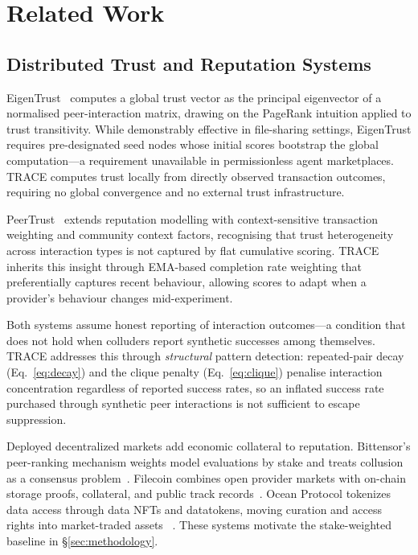 \documentclass[sigconf,nonacm,10pt]{acmart}
\begin{document}
\section{Related Work}
\label{sec:related}

\subsection{Distributed Trust and Reputation Systems}

EigenTrust~\cite{kamvar2003eigentrust} computes a global trust
vector as the principal eigenvector of a normalised
peer-interaction matrix, drawing on the PageRank intuition applied
to trust transitivity. While demonstrably effective in file-sharing
settings, EigenTrust requires pre-designated seed nodes whose
initial scores bootstrap the global computation---a requirement
unavailable in permissionless agent marketplaces. TRACE computes
trust locally from directly observed transaction outcomes,
requiring no global convergence and no external trust
infrastructure.

PeerTrust~\cite{xiong2004peertrust} extends reputation modelling
with context-sensitive transaction weighting and community context
factors, recognising that trust heterogeneity across interaction
types is not captured by flat cumulative scoring. TRACE inherits
this insight through EMA-based completion rate weighting that
preferentially captures recent behaviour, allowing scores to adapt
when a provider's behaviour changes mid-experiment.

Both systems assume honest reporting of interaction outcomes---a
condition that does not hold when colluders report synthetic
successes among themselves. TRACE addresses this through
\emph{structural} pattern detection: repeated-pair decay
(Eq.~\ref{eq:decay}) and the clique penalty
(Eq.~\ref{eq:clique}) penalise interaction concentration
regardless of reported success rates, so an inflated success rate
purchased through synthetic peer interactions is not sufficient
to escape suppression.

Deployed decentralized markets add economic collateral to reputation.
Bittensor's peer-ranking mechanism weights model evaluations by stake
and treats collusion as a consensus problem~\cite{rao2021bittensor}.
Filecoin combines open provider markets with on-chain storage proofs,
collateral, and public track records~\cite{filecoinSpec}. Ocean
Protocol tokenizes data access through data NFTs and datatokens,
moving curation and access rights into market-traded assets
~\cite{oceanDocs}. These systems motivate the stake-weighted baseline
in \S\ref{sec:methodology}.
\end{document}

